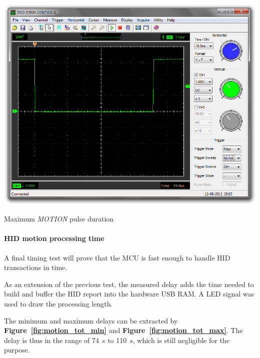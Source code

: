 \documentclass[a4paper,10pt]{article}
\makeatletter
\newenvironment{figurehere}{\def\@captype{figure}\vspace{2ex}}{\vspace{2ex}}
\newcommand{\citef}[1]{\textbf{Figure~\ref{#1}}}
\makeatother
\begin{document}
\begin{multicols}{2}
\begin{figurehere}
	\centering
	\includegraphics[keepaspectratio=true,width=\columnwidth]{images/motion_pulse_max.png}
	\caption{Maximum \emph{MOTION} pulse duration}
	\label{fig:motion_pulse_max}
\end{figurehere}


\paragraph{HID motion processing time}
A final timing test will prove that the MCU is fast enough to handle HID
transactions in time.

As an extension of the previous test, the measured delay adds the time needed
to build and buffer the HID report into the hardware USB RAM. A LED signal was
used to draw the processing length.

The minimum and maximum delays can be extracted by \citef{fig:motion_tot_min}
and \citef{fig:motion_tot_max}. The delay is thus in the range of 74~{\textmu}s
to 110~{\textmu}s, which is still negligible for the purpose.


\end{multicols}
\end{document}
